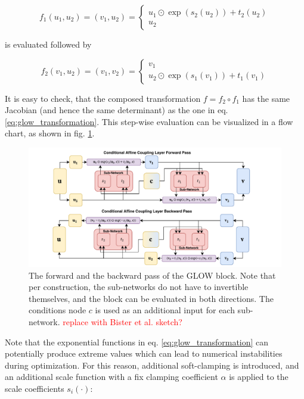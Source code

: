 \begin{equation*}
	f_1(u_1, u_2) = (v_1, u_2) = \begin{cases}
		u_1 \odot \exp(s_2(u_2)) + t_2(u_2) \\
		u_2
	\end{cases}
\end{equation*}

is evaluated followed by

\begin{equation*}
	f_2(v_1, u_2) = (v_1, v_2) = \begin{cases}
		v_1 \\
		 u_2 \odot \exp(s_1(v_1)) + t_1(v_1)
	\end{cases}
\end{equation*}

It is easy to check, that the composed transformation $f = f_2 \circ f_1$ has the same Jacobian (and hence the same determinant) as the one in eq. \ref{eq:glow_transformation}. This step-wise evaluation can be visualized in a flow chart, as shown in fig. \ref{fig:glow}.

\begin{figure}[h!]
	\centering
	\includegraphics[width=\linewidth]{figures/neural_networks/glow.pdf}
	\caption{The forward and the backward pass of the GLOW block. Note that per construction, the sub-networks do not have to invertible themselves, and the block can be evaluated in both directions. The conditions node $c$ is used as an additional input for each sub-network. \cite{Ksoll_2020} \textcolor{red}{replace with Bister et al. sketch?}}
	\label{fig:glow}
\end{figure}

Note that the exponential functions in eq. \ref{eq:glow_transformation} can potentially produce extreme values which can lead to numerical instabilities during optimization. For this reason, additional soft-clamping is introduced, and an additional scale function with a fix clamping coefficient $\alpha$ is applied to the scale coefficients $s_i(\cdot)$:

